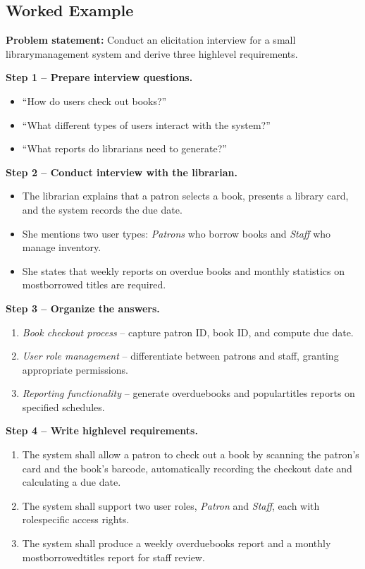 \documentclass[12pt, a4paper]{article}
\begin{document}
\subsection{Worked Example}
\textbf{Problem statement:} Conduct an elicitation interview for a small librarymanagement system and derive three highlevel requirements.

\textbf{Step 1 -- Prepare interview questions.}  
\begin{itemize}
\item ``How do users check out books?''  
\item ``What different types of users interact with the system?''  
\item ``What reports do librarians need to generate?''
\end{itemize}

\textbf{Step 2 -- Conduct interview with the librarian.}  
\begin{itemize}
\item The librarian explains that a patron selects a book, presents a library card, and the system records the due date.  
\item She mentions two user types: \emph{Patrons} who borrow books and \emph{Staff} who manage inventory.  
\item She states that weekly reports on overdue books and monthly statistics on mostborrowed titles are required.
\end{itemize}

\textbf{Step 3 -- Organize the answers.}  
\begin{enumerate}
\item \emph{Book checkout process} -- capture patron ID, book ID, and compute due date.  
\item \emph{User role management} -- differentiate between patrons and staff, granting appropriate permissions.  
\item \emph{Reporting functionality} -- generate overduebooks and populartitles reports on specified schedules.
\end{enumerate}

\textbf{Step 4 -- Write highlevel requirements.}  
\begin{enumerate}
\item The system shall allow a patron to check out a book by scanning the patron's card and the book's barcode, automatically recording the checkout date and calculating a due date.  
\item The system shall support two user roles, \emph{Patron} and \emph{Staff}, each with rolespecific access rights.  
\item The system shall produce a weekly overduebooks report and a monthly mostborrowedtitles report for staff review.
\end{enumerate}
\end{document}
